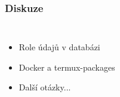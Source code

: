 \documentclass[10pt,xcolor=pdflatex]{beamer}
\begin{document}
\begin{frame}\frametitle{Diskuze}
    \begin{columns}
            \begin{itemize}
                \item{Role údajů v databázi}
                \item{Docker a termux-packages}
                \item{Další otázky...}
            \end{itemize}
            \vspace{0.7cm}
            \begin{figure}[b]
            \end{figure}
    \end{columns}
\end{frame}
\end{document}
